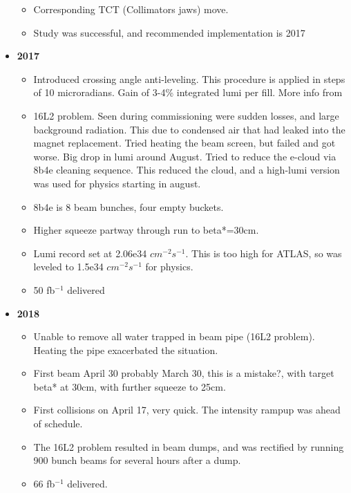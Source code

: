\begin{itemize}
\begin{itemize}
        \item Corresponding TCT (Collimators jaws) move. \cite{gorzawski}
        \item Study was successful, and recommended implementation is 2017  \cite{gorzawski}
    \end{itemize}
    \item \textbf{2017} \cite{lhcRun2}
    \begin{itemize}
        \item Introduced crossing angle anti-leveling. This procedure is applied in steps of 10 microradians. Gain of 3-4\% integrated lumi per fill. {\color{blue} More info from \cite{gorzawski}} \cite{lhcRun2}
        \item 16L2 problem. Seen during commissioning were sudden losses, and large background radiation. This due to condensed air that had leaked into the magnet replacement. Tried heating the beam screen, but failed and got worse. Big drop in lumi around August. Tried to reduce the e-cloud via 8b4e cleaning sequence. This reduced the cloud, and a high-lumi version was used for physics starting in august. \cite{lhcRun2}
        \item 8b4e is 8 beam bunches, four empty buckets. \cite{lhcRun2}
        \item Higher squeeze partway through run to beta*=30cm.  \cite{lhcRun2}
        \item Lumi record set at 2.06e34 $cm^{-2}s^{-1}$. This is too high for ATLAS, so was leveled to 1.5e34 $cm^{-2}s^{-1}$ for physics. \cite{lhcRun2}
        \item 50 fb$^{-1}$ delivered \cite{lhcRun2}
    \end{itemize}
    \item \textbf{2018} \cite{lhcRun2}
    \begin{itemize}
        \item Unable to remove all water trapped in beam pipe (16L2 problem). Heating the pipe exacerbated the situation.  \cite{lhcRun2}
        \item First beam April 30 {\color{red} probably March 30, this is a mistake?}, with target beta* at 30cm, with further squeeze to 25cm.  \cite{lhcRun2}
        \item First collisions on April 17, very quick. The intensity rampup was ahead of schedule. \cite{lhcRun2}
        \item The 16L2 problem resulted in beam dumps, and was rectified by running 900 bunch beams for several hours after a dump. \cite{lhcRun2}
        \item 66 fb$^{-1}$ delivered. \cite{lhcRun2}

\end{itemize}
\end{itemize}

